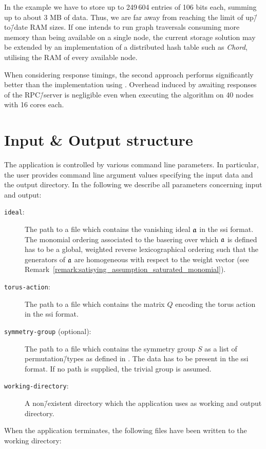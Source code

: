 In the \msix{} example we have to store up to 249\,604 entries of 106 bits each, summing up to about 3 MB of data. Thus, we are far away from reaching the limit of up\=/to\=/date RAM sizes. If one intends to run graph traversals consuming more memory than being available on a single node, the current storage solution may be extended by an implementation of a distributed hash table such as \emph{Chord}, utilising the RAM of every available node. \cite{chord}

When considering response timings, the second approach performs significantly better than the implementation using \beegfs{}. Overhead induced by awaiting responses of the RPC\=/server is negligible even when executing the algorithm on 40 nodes with 16 cores each.

\section{Input \& Output structure}

The application is controlled by various command line parameters. In particular, the user provides command line argument values specifying the input data and the output directory. In the following we describe all parameters concerning input and output:

\begin{description}
	\item[\texttt{ideal}:] The path to a file which contains the vanishing ideal $\mathfrak{a}$ in the \ac{ssi} format. The monomial ordering associated to the basering over which $\mathfrak{a}$ is defined has to be a global, weighted reverse lexicographical ordering such that the generators of $\mathfrak{a}$ are homogeneous with respect to the weight vector (see Remark~\ref{remark:satisying_assumption_saturated_monomial}).
	\item[\texttt{torus-action}:] The path to a file which contains the matrix $Q$ encoding the torus action in the \ac{ssi} format.
	\item[\texttt{symmetry-group} (optional):] The path to a file which contains the symmetry group $S$ as a list of permutation\=/types as defined in \gitfanlib{}. The data has to be present in the \ac{ssi} format. If no path is supplied, the trivial group is assumed.
	\item[\texttt{working-directory}:] A non\=/existent directory which the application uses as working and output directory.
\end{description}

When the application terminates, the following files have been written to the working directory:

